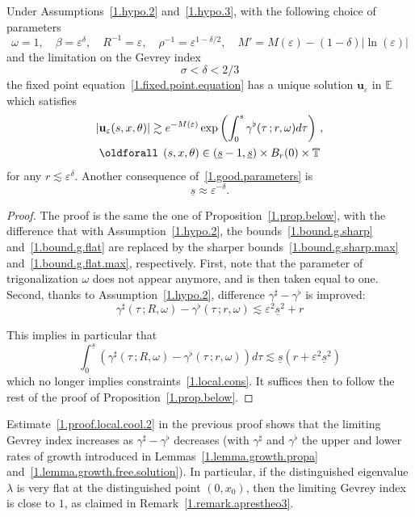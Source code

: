 \documentclass[AHL,Unicode,longabstracts,published]{cedram}
\theoremstyle{plain}
\newcommand*\e{\varepsilon}
\newcommand*\EE{{\mathbb E}}
\newcommand*\g{\gamma}
\newcommand{\ubf}{{\mathbf u}}
\newcommand*\und{\underline}
\renewcommand*{\forall}{\mathrel{\oldforall}}
\begin{document}
\begin{prop}\label{1.prop.below.max}
Under Assumptions~\ref{1.hypo.2} and~\ref{1.hypo.3}, with the following choice of parameters
\begin{equation}
\label{1.good.parameters.max}
\omega = 1, \quad \beta = \e^{\delta}, \quad R^{-1} = \e, \quad \rho^{-1} = \e^{1-\delta/2}, \quad M' = M(\e) - (1-\delta)|\ln(\e)|
\end{equation}
and the limitation on the Gevrey index
\[
\sigma < \delta <2/3
\]
the fixed point equation~\eqref{1.fixed.point.equation} has a unique solution $\ubf_{\e}$ in $\EE$ which satisfies
\begin{multline}
|\ubf_{\e}(s,x,\theta)| \gtrsim e^{-M(\e)} \exp \left(\int_{0}^{s} \g^{\flat}(\tau\,; r, \omega) d\tau \right) \,, \\
\forall\,(s,x,\theta)\in(\und{s} - 1, \und{s}) \times B_r(0)\times\mathbb{T}
\end{multline}
for any $r \lesssim \e^{\delta}$. Another consequence of~\eqref{1.good.parameters} is
\begin{equation}
\label{1.final.und.s.max}
\und{s} \approx \e^{-\delta}.
\end{equation}
\end{prop}

\begin{proof}
The proof is the same the one of Proposition~\ref{1.prop.below}, with the difference that with Assumption~\ref{1.hypo.2}, the bounds~\eqref{1.bound.g.sharp} and~\eqref{1.bound.g.flat} are replaced by the sharper bounds~\eqref{1.bound.g.sharp.max} and~\eqref{1.bound.g.flat.max}, respectively. First, note that the parameter of trigonalization $\omega$ does not appear anymore, and is then taken equal to one. Second, thanks to Assumption~\ref{1.hypo.2}, difference $\g^{\sharp} - \g^{\flat}$ is improved:
\begin{equation}
\label{1.proof.local.cool.2}
\g^{\sharp}(\tau\, ; R,\omega) - \g^{\flat}(\tau\, ; r,\omega) \lesssim \e^{2}\und{s}^{2} + r
\end{equation}

This implies in particular that
\[
\int_{0}^{\und{s}} (\g^{\sharp}(\tau\, ; R,\omega) - \g^{\flat}(\tau\, ; r,\omega)) d\tau \lesssim \und{s}\left(r + \e^{2}\und{s}^2 \right)
\]
which no longer implies constraints~\eqref{1.local.cons}. It suffices then to follow the rest of the proof of Proposition~\ref{1.prop.below}.
\end{proof}

\begin{rema}\label{1.remark.amelioration}

Estimate~\eqref{1.proof.local.cool.2} in the previous proof shows that the limiting Gevrey index increases as $\g^{\sharp} - \g^{\flat}$ decreases (with $\g^{\sharp}$ and $\g^{\flat}$ the upper and lower rates of growth introduced in Lemmas~\ref{1.lemma.growth.propa} and~\ref{1.lemma.growth.free.solution}). In particular, if the distinguished eigenvalue $\lambda$ is very flat at the distinguished point $(0,x_0)$, then the limiting Gevrey index is close to $1$, as claimed in Remark~\ref{1.remark.aprestheo3}.
\end{rema}
\end{document}

